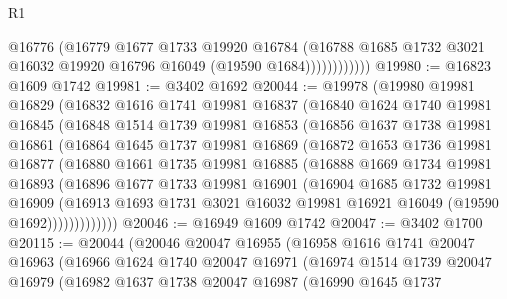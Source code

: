 \begin{lexlean}{R1}
\begin{coremodule}
                      @16776
                      (@16779
                        @1677
                        @1733
                        @19920
                        @16784
                        (@16788
                          @1685
                          @1732
                          @3021
                          @16032
                          @19920
                          @16796
                          @16049
                          (@19590 @1684))))))))))))
@19980 := @16823 @1609 @1742
@19981 := @3402 @1692
@20044 := @19978
    (@19980
      @19981
      @16829
      (@16832
        @1616
        @1741
        @19981
        @16837
        (@16840
          @1624
          @1740
          @19981
          @16845
          (@16848
            @1514
            @1739
            @19981
            @16853
            (@16856
              @1637
              @1738
              @19981
              @16861
              (@16864
                @1645
                @1737
                @19981
                @16869
                (@16872
                  @1653
                  @1736
                  @19981
                  @16877
                  (@16880
                    @1661
                    @1735
                    @19981
                    @16885
                    (@16888
                      @1669
                      @1734
                      @19981
                      @16893
                      (@16896
                        @1677
                        @1733
                        @19981
                        @16901
                        (@16904
                          @1685
                          @1732
                          @19981
                          @16909
                          (@16913
                            @1693
                            @1731
                            @3021
                            @16032
                            @19981
                            @16921
                            @16049
                            (@19590 @1692)))))))))))))
@20046 := @16949 @1609 @1742
@20047 := @3402 @1700
@20115 := @20044
    (@20046
      @20047
      @16955
      (@16958
        @1616
        @1741
        @20047
        @16963
        (@16966
          @1624
          @1740
          @20047
          @16971
          (@16974
            @1514
            @1739
            @20047
            @16979
            (@16982
              @1637
              @1738
              @20047
              @16987
              (@16990
                @1645
                @1737

\end{coremodule}
\end{lexlean}
